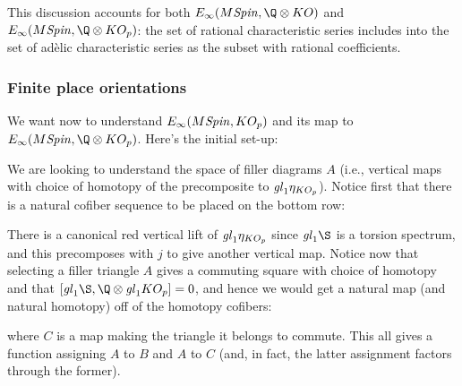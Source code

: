 This discussion accounts for both $E_\infty(M\Spin, \Q \otimes KO)$ and $E_\infty(M\Spin, \Q \otimes KO_p)$: the set of rational characteristic series includes into the set of ad\`elic characteristic series as the subset with rational coefficients.




\subsubsection{Finite place orientations}

We want now to understand $E_\infty(M\mathit{Spin}, KO_p)$ and its map to $E_\infty(M\Spin, \Q \otimes KO_p)$.  Here's the initial set-up:
\begin{center}
\end{center}
We are looking to understand the space of filler diagrams $A$ (i.e., vertical maps with choice of homotopy of the precomposite to $\mathit{gl}_1 \eta_{KO_p}$).  Notice first that there is a natural cofiber sequence to be placed on the bottom row:
\begin{center}
\end{center}
There is a canonical red vertical lift of $\mathit{gl}_1 \eta_{KO_p}$ since $\gl_1 \S$ is a torsion spectrum, and this precomposes with $j$ to give another vertical map.  Notice now that selecting a filler triangle $A$ gives a commuting square with choice of homotopy and that $[\gl_1 \S, \Q \otimes \gl_1 KO_p] = 0$, and hence we would get a natural map (and natural homotopy) off of the homotopy cofibers:
\begin{center}
\end{center}
where $C$ is a map making the triangle it belongs to commute.  This all gives a function assigning $A$ to $B$ and $A$ to $C$ (and, in fact, the latter assignment factors through the former).

